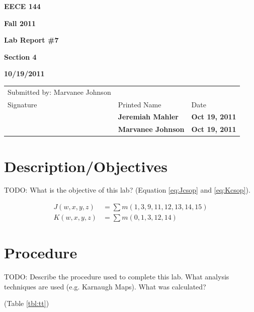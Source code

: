 \documentclass[12pt]{article}
\begin{document}

\centerline{\bf EECE 144}
\centerline{\bf Fall 2011}
\centerline{\bf}
\centerline{\bf Lab Report \#7}
\centerline{\bf Section 4}
\centerline{\bf 10/19/2011}

\begin{center}
\begin{tabularx}{\textwidth}[b]{X l l}
Submitted by: Marvanee Johnson & & \\
Signature & Printed Name & Date \\
\hline
\multicolumn{1}{|X|}{} & \multicolumn{1}{|l|}{\bigstrut \bf Jeremiah Mahler} & \multicolumn{1}{|l|}{\bf Oct 19, 2011} \\
\hline
\multicolumn{1}{|X|}{} & \multicolumn{1}{|l|}{\bigstrut \bf Marvanee Johnson} & \multicolumn{1}{|l|}{\bf Oct 19, 2011} \\
\hline
\end{tabularx}
\end{center}

\section{Description/Objectives}

TODO: What is the objective of this lab?
(Equation \ref{eq:Jcsop} and \ref{eq:Kcsop}).

\begin{align}
J(w, x, y, z) &= \sum m(1,3,9,11,12,13,14,15) \label{eq:Jcsop} \\
K(w, x, y, z) &= \sum m(0,1,3,12,14) \label{eq:Kcsop}
\end{align}

\section{Procedure}
\label{sec:procedure}

TODO: Describe the procedure used to complete this lab.
What analysis techniques are used (e.g. Karnaugh Maps).
What was calculated?

(Table \ref{tbl:tt})
\end{document}
